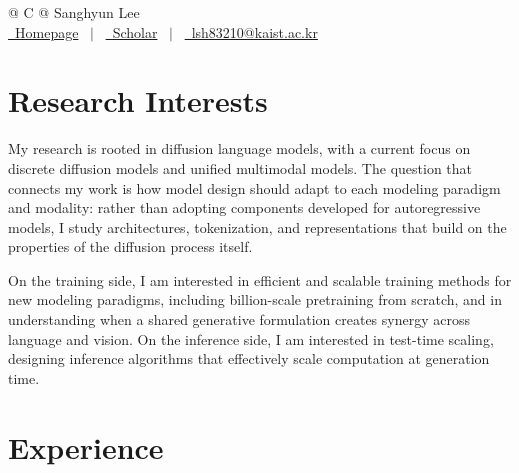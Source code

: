 \documentclass[a4paper,10.5pt]{article}
\begin{document}
\pagestyle{empty}


\begin{tabularx}{\linewidth}{@{} C @{}}
\Huge{Sanghyun Lee} \\[7.5pt]


\href{https://lsh83210.github.io/}{\raisebox{-0.05\height}\faGlobe\ Homepage}
\ $|$ \
\href{https://scholar.google.com/citations?user=UQN24j8AAAAJ\&hl}{\raisebox{-0.05\height}\faUserGraduate\ Scholar}
\ $|$ \
\href{mailto:lsh83210@kaist.ac.kr}{\raisebox{-0.05\height}\faEnvelope\ lsh83210@kaist.ac.kr}

\end{tabularx}


\section{Research Interests}

My research is rooted in diffusion language models, with a current focus on discrete diffusion models and unified multimodal models. The question that connects my work is how model design should adapt to each modeling paradigm and modality: rather than adopting components developed for autoregressive models, I study architectures, tokenization, and representations that build on the properties of the diffusion process itself.

On the training side, I am interested in efficient and scalable training methods for new modeling paradigms, including billion-scale pretraining from scratch, and in understanding when a shared generative formulation creates synergy across language and vision. On the inference side, I am interested in test-time scaling, designing inference algorithms that effectively scale computation at generation time.


\section{Experience}
\end{document}
